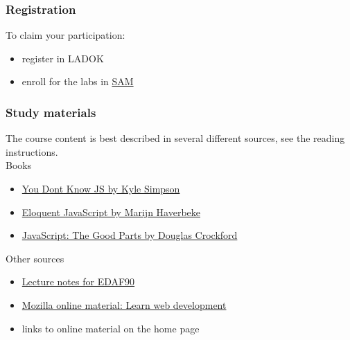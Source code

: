 \documentclass[aspectratio=1610]{beamer}
\begin{document}
\begin{frame}
  \frametitle{Registration}
To claim your participation:
\begin{itemize}
  \item register in LADOK
  \item enroll for the labs in \href{https://sam.cs.lth.se/LabsSelectSession?occasionId=693}{SAM}
\end{itemize}

\end{frame}

\begin{frame}
  \frametitle{Study materials}

The course content is best described in several different sources, see the reading instructions.
\\ \vspace{3mm}
Books
\begin{itemize}
\item \href{https://github.com/getify/You-Dont-Know-JS}{You Dont Know JS by Kyle Simpson} 
\item \href{https://eloquentjavascript.net/}{Eloquent JavaScript by Marijn Haverbeke}
\item \href{http://shop.oreilly.com/product/9780596517748.do}{JavaScript: The Good Parts by Douglas Crockford}
\end{itemize}

Other sources
\begin{itemize}
\item \href{http://fileadmin.cs.lth.se/cs/Education/EDAF90/lectures/lecture-notes.pdf}{Lecture notes for EDAF90}
\item \href{https://developer.mozilla.org/en-US/docs/Learn}{Mozilla online material: Learn web development}
\item links to online material on the home page
\end{itemize}

\end{frame}

\begin{frame}[plain]
  \endpage
\end{frame}

\end{document}
